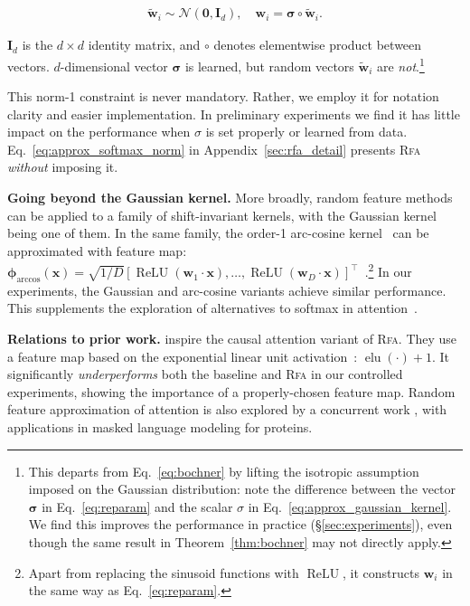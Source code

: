 \begin{align}\label{eq:reparam}
    \widetilde{{\mathbf{w}}}_i\sim {\mathcal{N}}({\mathbf{0}}, {\mathbf{I}}_d), \quad 
    {\mathbf{w}}_i = \boldsymbol{\sigma}\circ\widetilde{{\mathbf{w}}}_i.
\end{align}

${\mathbf{I}}_d$ is the $d\times d$ identity matrix, and $\circ$ denotes elementwise product between vectors. $d$-dimensional vector $\boldsymbol{\sigma}$ is learned, {but random vectors $\widetilde{{\mathbf{w}}}_i$ are \emph{not}.}\footnote{
 This departs from Eq.~\ref{eq:bochner}
by lifting the isotropic assumption imposed on the Gaussian distribution: note the difference between the vector $\boldsymbol{\sigma}$
in Eq.~\ref{eq:reparam} and the scalar $\sigma$ in Eq.~\ref{eq:approx_gaussian_kernel}.
We find this improves the performance in practice (\S\ref{sec:experiments}),
even though the same result in Theorem~\ref{thm:bochner} may not directly apply. } 

This norm-1 constraint is never mandatory. Rather, we employ it for notation clarity and easier implementation. In preliminary experiments we find it has little impact on the performance when $\sigma$ is set properly or learned from data.
Eq.~\ref{eq:approx_softmax_norm} in Appendix~\ref{sec:rfa_detail}
presents \textsc{Rfa} \emph{without} imposing it.

\textbf{Going beyond the Gaussian kernel.} More broadly, random feature methods can be applied to a family of shift-invariant kernels, with the Gaussian kernel being one of them. In the same family, the order-1 arc-cosine kernel~\citep{cho2009kernel} can be approximated with feature map:
$\boldsymbol{\phi}_{\arccos}({\mathbf{x}}) = \sqrt{1/D}[\operatorname{ReLU}({\mathbf{w}}_1\cdot{\mathbf{x}}),\dots,\operatorname{ReLU}({\mathbf{w}}_D\cdot{\mathbf{x}})]^\top$~\citep{alber2017empirical}.\footnote{
Apart from replacing the sinusoid functions with $\operatorname{ReLU}$,
it constructs ${\mathbf{w}}_i$ in the same way as Eq.~\ref{eq:reparam}.
}
In our experiments, the Gaussian and arc-cosine variants achieve similar performance. This supplements the exploration of alternatives to softmax in attention~\citep{tsai2019transformer,gao2019kernel}.

\textbf{Relations to prior work.}
\citet{katharopoulos20transformers} inspire the causal attention variant of \textsc{Rfa}.
They use a feature map based on the  exponential linear unit activation~\citep{clevert2016fast}:
$\operatorname{elu}(\boldsymbol{\cdot}) + 1$. It significantly \emph{underperforms} both the baseline and \textsc{Rfa}
in our controlled experiments, showing the importance of a properly-chosen feature map. Random feature approximation of attention is also explored by a concurrent work \citep{choromanski2020masked}, with applications in masked language modeling for proteins.

